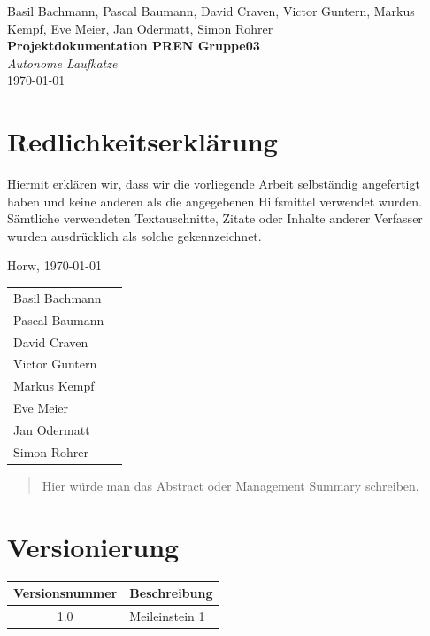 \documentclass[a4paper]{report}
\newcommand*{\titleAP}{\begingroup %
	\centering
	\vspace*{\baselineskip} %

	{Basil Bachmann, Pascal Baumann, David Craven, Victor Guntern, Markus Kempf, Eve Meier, Jan Odermatt, Simon Rohrer}\\[0.167\textheight] %

	{\Huge\bfseries Projektdokumentation PREN Gruppe03}\\[\baselineskip]

	{\Large \textit{Autonome Laufkatze}}\\
	\today

	\vspace*{3\baselineskip} %
	\endgroup}
\begin{document}

\titleAP

\newpage

\chapter*{Redlichkeitserklärung}
Hiermit erklären wir, dass wir die vorliegende Arbeit selbständig angefertigt haben und keine anderen als die angegebenen Hilfsmittel verwendet wurden. Sämtliche verwendeten Textauschnitte, Zitate oder Inhalte anderer Verfasser wurden ausdrücklich als solche gekennzeichnet.

\vspace{1.5em}

\noindent
Horw, \today

\vspace{2em}

\noindent
\begin{tabular}{lp{}}
	Basil Bachmann & \\[1em]
	\cline{2-2}
	Pascal Baumann &  \\[1em]
	\cline{2-2}
	David Craven & \\[1em]
	\cline{2-2}
	Victor Guntern & \\[1em]
	\cline{2-2}
	Markus Kempf & \\[1em]
	\cline{2-2}
	Eve Meier & \\[1em]
	\cline{2-2}
	Jan Odermatt & \\[1em]
	\cline{2-2}
	Simon Rohrer &  \\[1em]
	\cline{2-2}
\end{tabular}

\newpage

\begin{abstract}
	Hier würde man das Abstract oder Management Summary schreiben.
\end{abstract}

\chapter*{Versionierung}
\vspace{2em}

\noindent
\begin{tabular}{|c|p{}|}
	\hline
	\textbf{Versionsnummer} & \textbf{Beschreibung}\\
	\hline
	1.0 & Meileinstein 1 \\
	\hline
\end{tabular}
\end{document}

